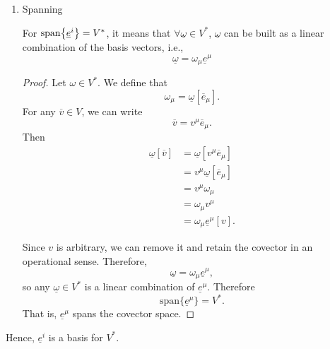 \documentclass[12pt,a4paper]{article}
\newcommand{\und}[1]{\underline{#1}}
\newcommand{\ovr}[1]{\overline{#1}}
\begin{document}
\begin{solution_pset}
\begin{enumerate}[(1)]
\begin{enumerate}
\begin{proof}
							Evaluating both sides on $e_\nu\in V$ gives
							\begin{align*}
								a_\mu \und e^\mu[\ovr e_\nu]
								&=\und 0[\ovr e_\nu]\\
								a_\mu\delta^\mu_\nu
								&=0\\
								a_\nu&=0.
							\end{align*}
							Since this holds for every $\nu$, we have
							$a_\mu=0$ for all $\mu$. Hence
							$\{\und e^\mu\}$ is linearly independent.
						\end{proof}
					\item Spanning

						For $\mathrm{span} \qty{\und e^i} = V^*$, it means that
						$\forall \und\omega\in V^*$, $\und\omega$ can be built as a linear combination of the basis vectors,
						i.e.,
						\[
							\und\omega = \omega_\mu \und e^\mu
						\]
						\begin{proof}
							Let $\omega\in V^*$. We define that
							\[
								\omega_\mu=\und \omega[\ovr e_\mu].
							\]
							For any $\ovr v\in V$, we can write
							\[
								\ovr v=v^\mu \ovr e_\mu.
							\]
							Then
							\begin{align*}
								\und\omega[\ovr v]
								&=\und\omega[v^\mu \ovr e_\mu]\\
								&=v^\mu\und\omega[\ovr e_\mu]\\
								&=v^\mu\omega_\mu \\
								&= \omega_\mu v^\mu\\
								&=\omega_\mu \und e^\mu[v].
							\end{align*}

							Since $v$ is arbitrary, we can remove it and
							retain the covector in an operational sense.
							Therefore,
							\[
								\und\omega=\omega_\mu \und e^\mu,
							\]
							so any $\und \omega\in V^*$ is a linear combination
							of $\und e^\mu$. Therefore
							\[
								\mathrm{span}{\{\und e^\mu\}}=V^*.
							\]
							That is, $\und e^\mu$ spans the covector space.
						\end{proof}
				\end{enumerate}

				Hence, $\und e^i$ is a basis for $V^*$.
		\end{enumerate}

	\end{solution_pset}
	\newpage
\end{document}
